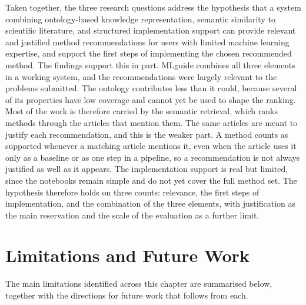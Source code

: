 Taken together, the three research questions address the hypothesis 
that a system combining ontology-based knowledge representation, 
semantic similarity to scientific literature, and structured 
implementation support can provide relevant and justified method 
recommendations for users with limited machine learning expertise, 
and support the first steps of implementing the chosen recommended method. The 
findings support this in part. MLguide combines all three elements in 
a working system, and the recommendations were largely relevant to the 
problems submitted. The ontology contributes less than it could, 
because several of its properties have low coverage and cannot yet be 
used to shape the ranking. Most of the work is therefore carried by 
the semantic retrieval,
which ranks methods through the articles that mention them. The same
articles are meant to justify each recommendation, and this is the
weaker part. A method counts as supported whenever a matching article
mentions it, even when the article uses it only as a baseline or as
one step in a pipeline, so a recommendation is not always justified as
well as it appears.
The implementation support is real but limited, since the notebooks 
remain simple and do not yet cover the full method set. 
The hypothesis therefore holds on three counts: relevance, the first 
steps of implementation, and the combination of the three elements, 
with justification as the main reservation and the scale of the 
evaluation as a further limit.

\section{Limitations and Future Work}
\label{sec:limitations-and-future-work}

The main limitations identified across this chapter are summarised 
below, together with the directions for future work that follows from each.

